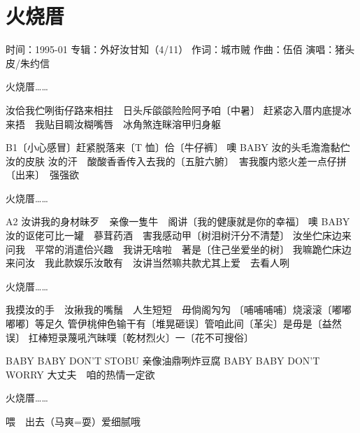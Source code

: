 \documentclass[UTF8,a4paper,oneside,twocolumn,12pt]{ctexbook}
\newcommand{\infopair}[2]{\textbullet #1：#2}
\newcommand{\zc}[1][伍佰]{\infopair{作词}{#1}}
\newcommand{\zq}[1][伍佰]{\infopair{作曲}{#1}}
\newcommand{\zj}[1]{\infopair{专辑}{#1}}
\newcommand{\sj}[1]{\infopair{时间}{#1}}
\newenvironment{info}{\begin{flushleft}\kaishu
	}
	{\end{flushleft}\normalsize\yahei\par}
\newenvironment{lyric}{
	}
{}
\begin{document}
\section{火烧厝}
\begin{info}
	\sj{1995-01}
	\zj{外好汝甘知（4/11）}
	\zc[城市贼]
	\zq[伍佰]
	\infopair{演唱}{猪头皮/朱约信}
\end{info}
\begin{lyric}
	火烧厝……

	汝佮我伫咧街仔路来相拄　日头斥燄燄险险阿予咱〔中暑〕
	赶紧宓入厝内底提冰来捂　我贴目睭汝糊嘴唇　冰角煞连眯溶甲归身躯

	B1〔小心感冒〕赶紧脱落来〔T 恤〕佮〔牛仔裤〕
	噢 BABY 汝的头毛澹澹黏伫汝的皮肤
	汝的汗　酸酸香香传入去我的〔五脏六腑〕　害我腹内慾火差一点仔拼〔出来〕　强强欲

	火烧厝……

	A2 汝讲我的身材昧歹　亲像一隻牛　阁讲〔我的健康就是你的幸福〕
	噢 BABY 汝的讴佬可比一罐　蔘茸药酒　害我感动甲〔树泪树汗分不清楚〕
	汝坐伫床边来问我　平常的消遣佮兴趣　我讲无啥啦　著是〔住己坐爱坐的树〕
	我嘛跪伫床边来问汝　我此款娱乐汝敢有　汝讲当然嘛共款尤其上爱　去看人咧

	火烧厝……

	我摸汝的手　汝揪我的嘴鬚　人生短短　毋倘阁勼勼
	〔哺哺哺哺〕烧滚滚〔嘟嘟嘟嘟〕等足久
	管伊桃伸色输干有〔堆晃砸误〕管咱此间〔革尖〕是毋是〔益然误〕
	扛棒短录蔑吼汽昧噗〔乾材烈火〕一〔花不可搜俗〕

	BABY BABY DON'T STOBU 亲像油鼎咧炸豆腐
	BABY BABY DON'T WORRY 大丈夫　咱的热情一定欲

	火烧厝……

	喂　出去（马爽=耍）爱细腻哦
\end{lyric}
\end{document}
